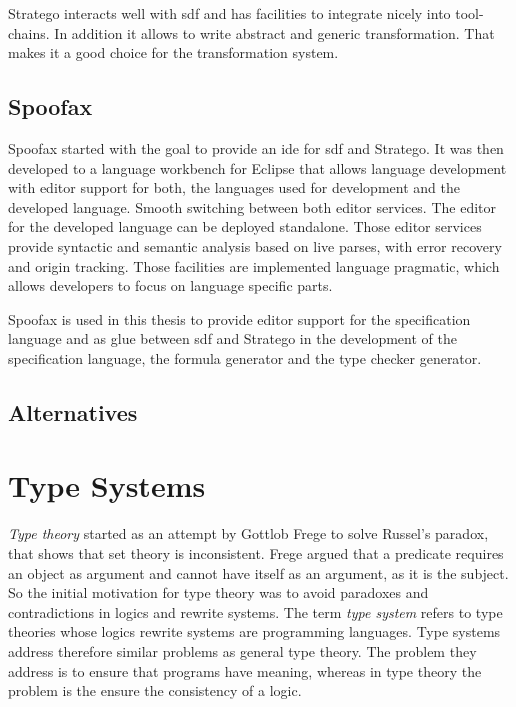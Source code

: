 
Stratego interacts well with \gls{sdf} and has facilities to integrate
nicely into tool-chains. In addition it allows to write abstract and
generic transformation. That makes it a good choice for the
transformation system.
\subsection{Spoofax}
Spoofax started with the goal to provide an \gls{ide} for \gls{sdf} and
Stratego. It was then developed to a language workbench for Eclipse
that allows language development with editor support for both, the
languages used for development and the developed language. Smooth
switching between both editor services. The editor for the developed
language can be deployed standalone. Those editor services provide
syntactic and semantic analysis based on live parses, with error
recovery and origin tracking. Those facilities are implemented
language pragmatic, which allows developers to focus on language
specific parts.

Spoofax is used in this thesis to provide editor support for the
specification language and as glue between \gls{sdf} and Stratego in the
development of the specification language, the formula generator and
the type checker generator.
\subsection{Alternatives}
\section{Type Systems}
\textit{Type theory} started as an attempt by Gottlob Frege to solve Russel's
paradox, that shows that \naive{} set theory is inconsistent. Frege
argued that a predicate requires an object as argument and cannot have
itself as an argument, as it is the subject. So the initial motivation for type theory was to avoid
paradoxes and contradictions in logics and rewrite systems. The term
\textit{type system} refers to type theories whose logics rewrite
systems are programming languages. Type systems address therefore
similar problems as general type theory. The problem they address is
to ensure that programs have meaning, whereas in type theory the
problem is the ensure the consistency of a logic.

